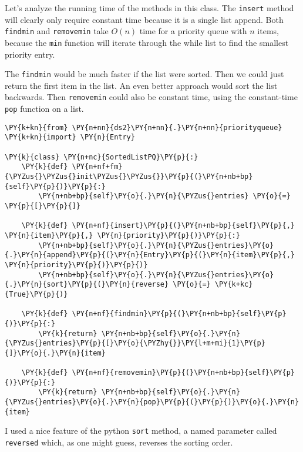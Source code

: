 Let's analyze the running time of the methods in this class.
The \texttt{insert} method will clearly only require constant time because it is a single list append.  Both \texttt{findmin} and \texttt{removemin} take $O(n)$ time for a priority queue with $n$ items, because the \texttt{min} function will iterate through the while list to find the smallest priority entry.


The \texttt{findmin} would be much faster if the list were sorted.  Then we could just return the first item in the list.  An even better approach would sort the list backwards.  Then \texttt{removemin} could also be constant time, using the constant-time \texttt{pop} function on a list.

\begin{Verbatim}[commandchars=\\\{\}]
\PY{k+kn}{from} \PY{n+nn}{ds2}\PY{n+nn}{.}\PY{n+nn}{priorityqueue} \PY{k+kn}{import} \PY{n}{Entry}

\PY{k}{class} \PY{n+nc}{SortedListPQ}\PY{p}{:}
    \PY{k}{def} \PY{n+nf+fm}{\PYZus{}\PYZus{}init\PYZus{}\PYZus{}}\PY{p}{(}\PY{n+nb+bp}{self}\PY{p}{)}\PY{p}{:}
        \PY{n+nb+bp}{self}\PY{o}{.}\PY{n}{\PYZus{}entries} \PY{o}{=} \PY{p}{[}\PY{p}{]}

    \PY{k}{def} \PY{n+nf}{insert}\PY{p}{(}\PY{n+nb+bp}{self}\PY{p}{,} \PY{n}{item}\PY{p}{,} \PY{n}{priority}\PY{p}{)}\PY{p}{:}
        \PY{n+nb+bp}{self}\PY{o}{.}\PY{n}{\PYZus{}entries}\PY{o}{.}\PY{n}{append}\PY{p}{(}\PY{n}{Entry}\PY{p}{(}\PY{n}{item}\PY{p}{,} \PY{n}{priority}\PY{p}{)}\PY{p}{)}
        \PY{n+nb+bp}{self}\PY{o}{.}\PY{n}{\PYZus{}entries}\PY{o}{.}\PY{n}{sort}\PY{p}{(}\PY{n}{reverse} \PY{o}{=} \PY{k+kc}{True}\PY{p}{)}

    \PY{k}{def} \PY{n+nf}{findmin}\PY{p}{(}\PY{n+nb+bp}{self}\PY{p}{)}\PY{p}{:}
        \PY{k}{return} \PY{n+nb+bp}{self}\PY{o}{.}\PY{n}{\PYZus{}entries}\PY{p}{[}\PY{o}{\PYZhy{}}\PY{l+m+mi}{1}\PY{p}{]}\PY{o}{.}\PY{n}{item}

    \PY{k}{def} \PY{n+nf}{removemin}\PY{p}{(}\PY{n+nb+bp}{self}\PY{p}{)}\PY{p}{:}
        \PY{k}{return} \PY{n+nb+bp}{self}\PY{o}{.}\PY{n}{\PYZus{}entries}\PY{o}{.}\PY{n}{pop}\PY{p}{(}\PY{p}{)}\PY{o}{.}\PY{n}{item}
\end{Verbatim}



I used a nice feature of the python \texttt{sort} method, a named parameter called \texttt{reversed} which, as one might guess, reverses the sorting order.


